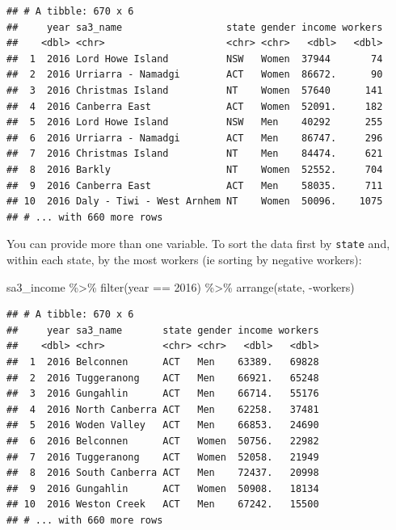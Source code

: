 \documentclass[
]{book}
\newenvironment{Shaded}{\begin{snugshade}}{\end{snugshade}}
\newcommand{\DecValTok}[1]{\textcolor[rgb]{0.00,0.00,0.81}{#1}}
\newcommand{\FunctionTok}[1]{\textcolor[rgb]{0.00,0.00,0.00}{#1}}
\newcommand{\NormalTok}[1]{#1}
\newcommand{\SpecialCharTok}[1]{\textcolor[rgb]{0.00,0.00,0.00}{#1}}
\begin{document}
\begin{verbatim}
## # A tibble: 670 x 6
##     year sa3_name                  state gender income workers
##    <dbl> <chr>                     <chr> <chr>   <dbl>   <dbl>
##  1  2016 Lord Howe Island          NSW   Women  37944       74
##  2  2016 Urriarra - Namadgi        ACT   Women  86672.      90
##  3  2016 Christmas Island          NT    Women  57640      141
##  4  2016 Canberra East             ACT   Women  52091.     182
##  5  2016 Lord Howe Island          NSW   Men    40292      255
##  6  2016 Urriarra - Namadgi        ACT   Men    86747.     296
##  7  2016 Christmas Island          NT    Men    84474.     621
##  8  2016 Barkly                    NT    Women  52552.     704
##  9  2016 Canberra East             ACT   Men    58035.     711
## 10  2016 Daly - Tiwi - West Arnhem NT    Women  50096.    1075
## # ... with 660 more rows
\end{verbatim}

You can provide more than one variable. To sort the data first by \texttt{state} and, within each state, by the most workers (ie sorting by negative workers):

\begin{Shaded}
\begin{Highlighting}[]
\NormalTok{sa3\_income }\SpecialCharTok{\%\textgreater{}\%}
  \FunctionTok{filter}\NormalTok{(year }\SpecialCharTok{==} \DecValTok{2016}\NormalTok{) }\SpecialCharTok{\%\textgreater{}\%} 
  \FunctionTok{arrange}\NormalTok{(state, }\SpecialCharTok{{-}}\NormalTok{workers)}
\end{Highlighting}
\end{Shaded}

\begin{verbatim}
## # A tibble: 670 x 6
##     year sa3_name       state gender income workers
##    <dbl> <chr>          <chr> <chr>   <dbl>   <dbl>
##  1  2016 Belconnen      ACT   Men    63389.   69828
##  2  2016 Tuggeranong    ACT   Men    66921.   65248
##  3  2016 Gungahlin      ACT   Men    66714.   55176
##  4  2016 North Canberra ACT   Men    62258.   37481
##  5  2016 Woden Valley   ACT   Men    66853.   24690
##  6  2016 Belconnen      ACT   Women  50756.   22982
##  7  2016 Tuggeranong    ACT   Women  52058.   21949
##  8  2016 South Canberra ACT   Men    72437.   20998
##  9  2016 Gungahlin      ACT   Women  50908.   18134
## 10  2016 Weston Creek   ACT   Men    67242.   15500
## # ... with 660 more rows
\end{verbatim}
\end{document}
